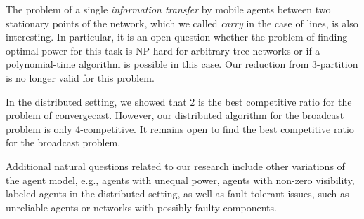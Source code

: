 \documentclass{article}
\begin{document}
The problem of a single {\em information transfer} by mobile agents between two stationary points of the network, which we called \emph{carry} in the case of lines, is also interesting. In particular, it is an open question whether the problem of finding optimal power for this task is NP-hard for arbitrary tree networks or if a polynomial-time algorithm is possible in this case. Our reduction from 3-partition is no longer valid for this problem. 

In the distributed setting, we showed that 2 is the best competitive ratio for the problem of convergecast. However, our distributed algorithm for the broadcast problem is only 4-competitive. It remains open to find the best competitive ratio for the broadcast problem.

Additional natural questions related to our research include
other variations of the agent model, e.g., agents with unequal power, agents with non-zero visibility, labeled agents in the distributed setting, as well as fault-tolerant issues, such as unreliable agents or networks with possibly faulty components.
\end{document}
